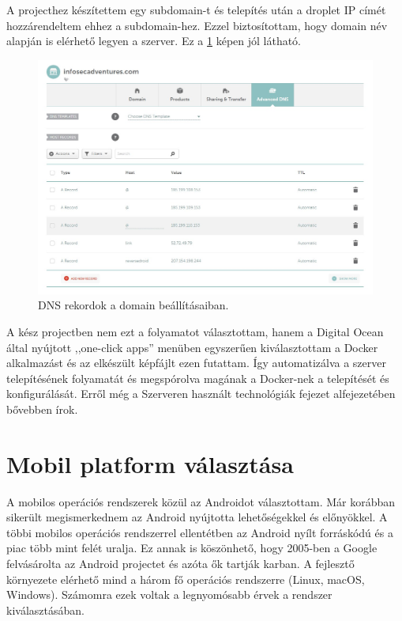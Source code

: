\documentclass{thesis-ekf}
\theoremstyle{definition}
\theoremstyle{remark}
\begin{document}
A projecthez készítettem egy subdomain-t és telepítés után a droplet IP címét hozzárendeltem ehhez a subdomain-hez.
Ezzel biztosítottam, hogy domain név alapján is elérhető legyen a szerver. Ez a \ref{namecheap} képen jól látható.

\begin{figure}[!h]
	\centering
	\includegraphics[width=15cm]{pictures/namecheap}
	\caption{DNS rekordok a domain beállításaiban.}
	\label{namecheap}
\end{figure}

A kész projectben nem ezt a folyamatot választottam, hanem a Digital Ocean által nyújtott ,,one-click apps'' menüben egyszerűen kiválasztottam a Docker alkalmazást és az elkészült képfájlt ezen futattam. 
Így automatizálva a szerver telepítésének folyamatát és megspórolva magának a Docker-nek a telepítését és konfigurálását.
Erről még a Szerveren használt technológiák fejezet  alfejezetében bővebben írok.

\section{Mobil platform választása}

A mobilos operációs rendszerek közül az Androidot választottam. Már korábban sikerült megismerkednem az Android nyújtotta lehetőségekkel és előnyökkel.
A többi mobilos operációs rendszerrel ellentétben az Android nyílt forráskódú és a piac több mint felét uralja.
Ez annak is köszönhető, hogy 2005-ben a Google felvásárolta az Android projectet és azóta ők tartják karban.
A fejlesztő környezete elérhető mind a három fő operációs rendszerre (Linux, macOS, Windows).
Számomra ezek voltak a legnyomósabb érvek a rendszer kiválasztásában.
\end{document}
